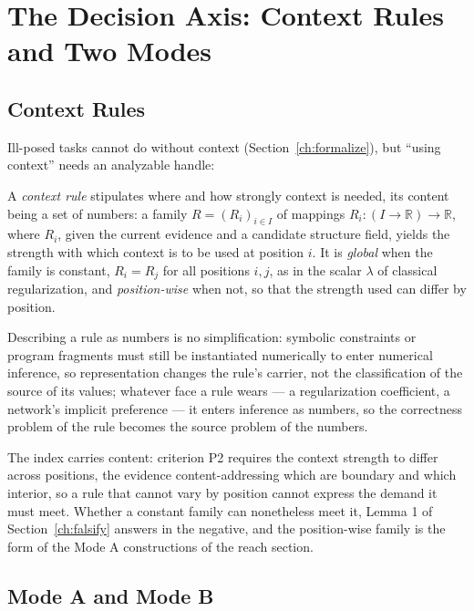 \section{The Decision Axis: Context Rules and Two Modes}
\label{ch:axis}

\subsection{Context Rules}

Ill-posed tasks cannot do without context (Section~\ref{ch:formalize}), but ``using context'' needs an analyzable handle:

\begin{defn}
A \emph{context rule} stipulates where and how strongly context is needed, its content being a set of numbers: a family $R = (R_i)_{i \in I}$ of mappings $R_i : (I \to \mathbb{R}) \to \mathbb{R}$, where $R_i$, given the current evidence and a candidate structure field, yields the strength with which context is to be used at position $i$. It is \emph{global} when the family is constant, $R_i = R_j$ for all positions $i, j$, as in the scalar $\lambda$ of classical regularization, and \emph{position-wise} when not, so that the strength used can differ by position.
\end{defn}

Describing a rule as numbers is no simplification: symbolic constraints or program fragments must still be instantiated numerically to enter numerical inference, so representation changes the rule's carrier, not the classification of the source of its values; whatever face a rule wears --- a regularization coefficient, a network's implicit preference --- it enters inference as numbers, so the correctness problem of the rule becomes the source problem of the numbers.

The index carries content: criterion P2 requires the context strength to differ across positions, the evidence content-addressing which are boundary and which interior, so a rule that cannot vary by position cannot express the demand it must meet. Whether a constant family can nonetheless meet it, Lemma 1 of Section~\ref{ch:falsify} answers in the negative, and the position-wise family is the form of the Mode A constructions of the reach section.

\subsection{Mode A and Mode B}

